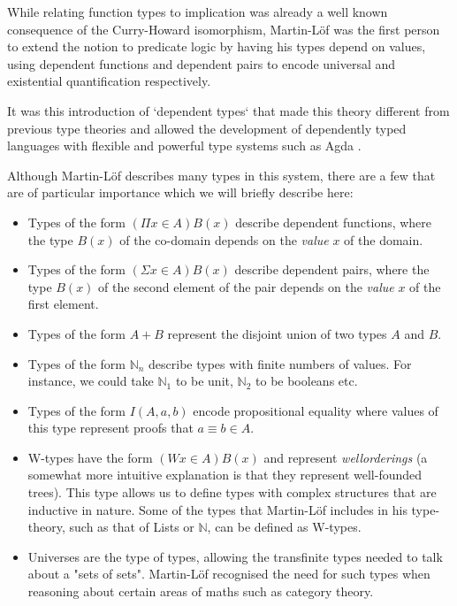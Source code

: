           While relating function types to implication was already
          a well known consequence of the Curry-Howard isomorphism,
          Martin-Löf was the first person to extend the notion to
          predicate logic by having his types depend on values,
          using dependent functions and dependent pairs to encode
          universal and existential quantification respectively.

          It was this introduction of `dependent types` that made this
          theory different from previous type theories and allowed
          the development of dependently typed languages with flexible
          and powerful type systems such as Agda \cite{norell}.

          Although Martin-Löf describes many types in this system,
          there are a few that are of particular importance which we will
          briefly describe here: 

          \begin{itemize}
          \item Types of the form $( \Pi x \in A ) B(x)$ describe
            dependent functions, where the type $B(x)$ of the co-domain
            depends on the \emph{value} $x$ of the domain.
          \item Types of the form $( \Sigma x \in A ) B(x)$ describe
            dependent pairs, where the type $B(x)$ of the second
            element of the pair depends on the \emph{value} $x$ of the
            first element.
          \item Types of the form $A + B$ represent the disjoint union
            of two types $A$ and $B$.
          \item Types of the form $\mathbb{N}_n$ describe types
            with finite numbers of values. For instance, we could take
            $\mathbb{N}_1$ to be unit, $\mathbb{N}_2$ to be booleans
            etc.
          \item Types of the form $I (A , a , b)$ encode propositional
            equality where values of this type represent proofs
            that $a \equiv b \in A$.
          \item W-types have the form
            $( W x \in A ) B(x)$ and represent \emph{wellorderings} (a
            somewhat more intuitive explanation is that they represent
            well-founded trees). This type allows us to define types
            with complex structures that are inductive in nature.
            Some of the types that Martin-Löf includes in his
            type-theory, such as that of Lists or $\mathbb{N}$, can be
            defined as W-types.
          \item Universes are the type of types, allowing
            the transfinite types needed to talk about a "sets of
            sets". Martin-Löf recognised the need for such types when
            reasoning about certain areas of maths such as category
            theory.
          \end{itemize}

